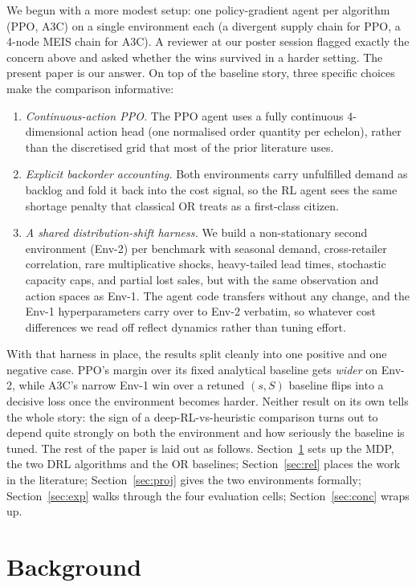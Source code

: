 \documentclass[letterpaper]{article} %
\begin{document}
We begun with a more modest setup: one policy-gradient agent per algorithm (PPO, A3C) on a single environment each (a divergent supply chain for PPO, a 4-node MEIS chain for A3C).  A reviewer at our poster session flagged exactly the concern above and asked whether the wins survived in a harder setting. The present paper is our answer. On top of the baseline story, three specific choices make the comparison informative:
\begin{enumerate}
\item \emph{Continuous-action PPO.} The PPO agent uses a fully continuous $4$-dimensional action head (one normalised order quantity per echelon), rather than the discretised grid that most of the prior literature uses.
\item \emph{Explicit backorder accounting.}  Both environments carry unfulfilled demand as backlog and fold it back into the cost signal, so the RL agent sees the same shortage penalty that classical OR treats as a first-class citizen.
\item \emph{A shared distribution-shift harness.} We build a non-stationary second environment (Env-2) per benchmark with seasonal demand, cross-retailer correlation, rare multiplicative shocks, heavy-tailed lead times, stochastic capacity caps, and partial lost sales, but with the same observation and action spaces as Env-1. The agent code transfers without any change, and the Env-1 hyperparameters carry over to Env-2 verbatim, so whatever cost differences we read off reflect dynamics rather than tuning effort.
\end{enumerate}
With that harness in place, the results split cleanly into one positive and one negative case. PPO's margin over its fixed analytical baseline gets \emph{wider} on Env-2, while A3C's narrow Env-1 win over a retuned $(s,S)$ baseline flips into a decisive loss once the environment becomes harder. Neither result on its own tells the whole story: the sign of a deep-RL-vs-heuristic comparison turns out to depend quite strongly on both the environment and how seriously the baseline is tuned.  The rest of the paper is laid out as follows.  Section~\ref{sec:bg} sets up the MDP, the two DRL algorithms and the OR baselines; Section~\ref{sec:rel} places the work in the literature; Section~\ref{sec:proj} gives the two environments formally; Section~\ref{sec:exp} walks through the four evaluation cells; Section~\ref{sec:conc} wraps up.

\section{Background}
\label{sec:bg}
\end{document}

